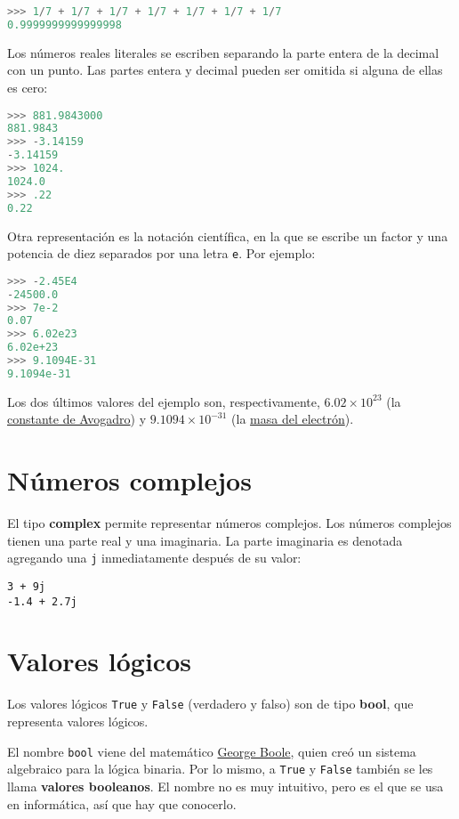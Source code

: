 \begin{lstlisting}[language=py]
>>> 1/7 + 1/7 + 1/7 + 1/7 + 1/7 + 1/7 + 1/7
0.9999999999999998
\end{lstlisting}

Los números reales literales se escriben separando la parte entera de la
decimal con un punto. Las partes entera y decimal pueden ser omitida si
alguna de ellas es cero:

\begin{lstlisting}[language=py]
>>> 881.9843000
881.9843
>>> -3.14159
-3.14159
>>> 1024.
1024.0
>>> .22
0.22
\end{lstlisting}

Otra representación es la notación científica, en la que se escribe un
factor y una potencia de diez separados por una letra \lstinline!e!. Por
ejemplo:

\begin{lstlisting}[language=py]
>>> -2.45E4
-24500.0
>>> 7e-2
0.07
>>> 6.02e23
6.02e+23
>>> 9.1094E-31
9.1094e-31
\end{lstlisting}

Los dos últimos valores del ejemplo son, respectivamente,
$6.02\times 10^{23}$ (la
\href{http://es.wikipedia.org/wiki/Constante\_de\_Avogadro}{constante de
Avogadro}) y $9.1094\times 10^{-31}$ (la
\href{http://es.wikipedia.org/wiki/Electr\%C3\%B3n\#Propiedades}{masa
del electrón}).

\section{Números complejos}

El tipo \textbf{complex} permite representar números complejos.
Los números complejos tienen una parte real y una imaginaria. La parte
imaginaria es denotada agregando una \lstinline!j! inmediatamente
después de su valor:

\begin{lstlisting}
3 + 9j
-1.4 + 2.7j
\end{lstlisting}

\section{Valores lógicos}

Los valores lógicos \lstinline!True! y \lstinline!False! (verdadero y
falso) son de tipo \textbf{bool}, que representa valores lógicos.

El nombre \lstinline!bool! viene del matemático
\href{http://es.wikipedia.org/wiki/George\_Boole}{George Boole}, quien
creó un sistema algebraico para la lógica binaria. Por lo mismo, a
\lstinline!True! y \lstinline!False! también se les llama
\textbf{valores booleanos}. El nombre no es muy intuitivo, pero es el
que se usa en informática, así que hay que conocerlo.

